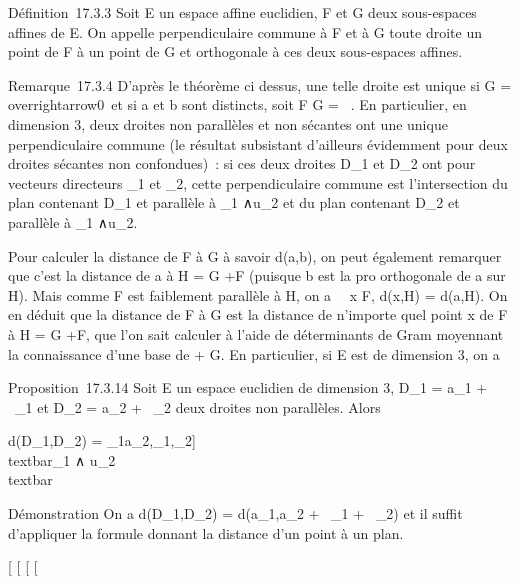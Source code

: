 \documentclass[]{article}
\begin{document}
Définition~17.3.3 Soit E un espace affine euclidien, F et G deux
sous-espaces affines de E. On appelle perpendiculaire commune à F et à G
toute droite \jmathoignant un point de F à un point de G et orthogonale à ces
deux sous-espaces affines.

Remarque~17.3.4 D'après le théorème ci dessus, une telle droite est
unique si \overrightarrowF
\bigcap\overrightarrow G =
\\overrightarrow0\
et si a et b sont distincts, soit F \bigcap G = \varnothing~. En particulier, en
dimension 3, deux droites non parallèles et non sécantes ont une unique
perpendiculaire commune (le résultat subsistant d'ailleurs évidemment
pour deux droites sécantes non confondues)~: si ces deux droites
D\_1 et D\_2 ont pour vecteurs directeurs
\overrightarrowu\_1 et
\overrightarrowu\_2, cette perpendiculaire
commune est l'intersection du plan contenant D\_1 et parallèle à
\overrightarrowu\_1
∧\overrightarrow u\_2 et du plan contenant
D\_2 et parallèle à
\overrightarrowu\_1
∧\overrightarrow u\_2.

Pour calculer la distance de F à G à savoir d(a,b), on peut également
remarquer que c'est la distance de a à H = G
+\overrightarrow F (puisque b est la pro\jmathection
orthogonale de a sur H). Mais comme F est faiblement parallèle à H, on a
\forall~~x \in F, d(x,H) = d(a,H). On en déduit que la
distance de F à G est la distance de n'importe quel point x de F à H = G
+, que l'on sait calculer à l'aide
de déterminants de Gram moyennant la connaissance d'une base de
\overrightarrowF +\overrightarrow
G. En particulier, si E est de dimension 3, on a

Proposition~17.3.14 Soit E un espace euclidien de dimension 3,
D\_1 = a\_1 +
~\overrightarrowu\_1 et D\_2 =
a\_2 + \mathbb{R}~\overrightarrowu\_2 deux
droites non parallèles. Alors

d(D\_1,D\_2) = \Big
\textbar{}{[}\overrightarrowa\_1a\_2,\overrightarrowu\_1,\overrightarrowu\_2{]}\Big
\textbar{} \over
\\textbar{}\overrightarrowu\_1
∧\overrightarrow
u\_2\\textbar{}

Démonstration On a d(D\_1,D\_2) =
d(a\_1,a\_2 +
~\overrightarrowu\_1 +
\mathbb{R}~\overrightarrowu\_2) et il suffit
d'appliquer la formule donnant la distance d'un point à un plan.

{[}
{[}
{[}
{[}
\end{document}
